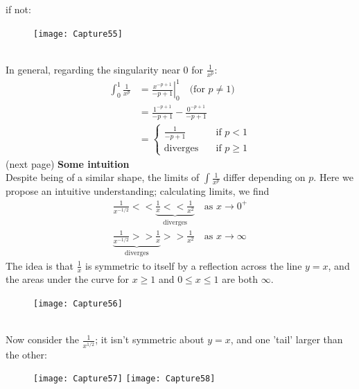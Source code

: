 \documentclass{report}
\begin{document}
if not:
\begin{figure}[h]
\texttt{[image: Capture55]}\\
\centering
{} 
\end{figure}\\
In general, regarding the singularity near 0 for $\frac{1}{x^p}$:
\begin{align*}
\int_0^1\frac{1}{x^p}&=\left.\frac{x^{-p+1}}{-p+1}\right|_0^1\quad\text{(for $p\neq1$)}\\
&=\frac{1^{-p+1}}{-p+1}-\frac{0^{-p+1}}{-p+1}\\
&=
\begin{cases}
\frac{1}{-p+1}\quad&\text{if }p<1\\
\text{diverges}\quad&\text{if }p\geq1
\end{cases}
\end{align*}
(next page)
\newpage
\noindent\textbf{Some intuition}\\
Despite being of a similar shape, the limits of $\int\frac{1}{x^p}$ differ depending on $p$.
Here we propose an intuitive understanding; calculating limits, we find
\begin{align*}
\frac{1}{x^{-1/2}}<<\underbrace{\frac{1}{x}<<\frac{1}{x^2}}_{\text{diverges}}\quad\text{as }
x\to0^+\\
\underbrace{\frac{1}{x^{-1/2}}>>\frac{1}{x}}_{\text{diverges}}>>\frac{1}{x^2}\quad\text{as }
x\to\infty
\end{align*}
The idea is that $\frac{1}{x}$ is symmetric to itself by a reflection across the line $y=x$, 
and the areas under the curve for $x\geq1$ and $0\leq x\leq1$ are both $\infty$.
\begin{figure}[h]
\texttt{[image: Capture56]}\\
\centering
{} 
\end{figure}\\
Now consider the $\frac{1}{x^{1/2}}$; it isn't symmetric about $y=x$, and one 'tail' larger
than the other:
\begin{figure}[h]
\texttt{[image: Capture57]}
\texttt{[image: Capture58]}\\
\centering
{}\\
\end{figure}\\
\end{document}
